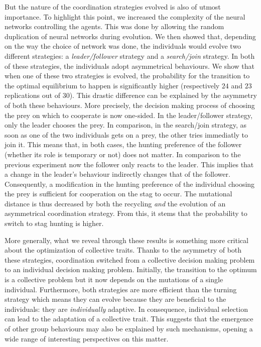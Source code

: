     But the nature of the coordination strategies evolved is also of utmost importance. To highlight this point, we increased the complexity of the neural networks controlling the agents. This was done by allowing the random duplication of neural networks during evolution. We then showed that, depending on the way the choice of network was done, the individuals would evolve two different strategies: a \emph{leader/follower} strategy and a \emph{search/join} strategy. In both of these strategies, the individuals adopt asymmetrical behaviours. We show that when one of these two strategies is evolved, the probability for the transition to the optimal equilibrium to happen is significantly higher (respectively $24$ and $23$ replications out of $30$). This drastic difference can be explained by the asymmetry of both these behaviours. More precisely, the decision making process of choosing the prey on which to cooperate is now one-sided. In the leader/follower strategy, only the leader chooses the prey. In comparison, in the search/join strategy, as soon as one of the two individuals gets on a prey, the other tries immediatly to join it. This means that, in both cases, the hunting preference of the follower (whether its role is temporary or not) does not matter. In comparison to the previous experiment now the follower only reacts to the leader. This implies that a change in the leader's behaviour indirectly changes that of the follower. Consequently, a modification in the hunting preference of the individual choosing the prey is sufficient for cooperation on the stag to occur. The mutational distance is thus decreased by both the recycling \emph{and} the evolution of an asymmetrical coordination strategy. From this, it stems that the probability to switch to stag hunting is higher. 

    More generally, what we reveal through these results is something more critical about the optimization of collective traits. Thanks to the asymmetry of both these strategies, coordination switched from a collective decision making problem to an individual decision making problem. Initially, the transition to the optimum is a collective problem but it now depends on the mutations of a single individual. Furthermore, both strategies are more efficient than the turning strategy which means they can evolve because they are beneficial to the individuals: they are \emph{individually} adaptive. In consequence, individual selection can lead to the adaptation of a collective trait. This suggests that the emergence of other group behaviours may also be explained by such mechanisms, opening a wide range of interesting perspectives on this matter.

